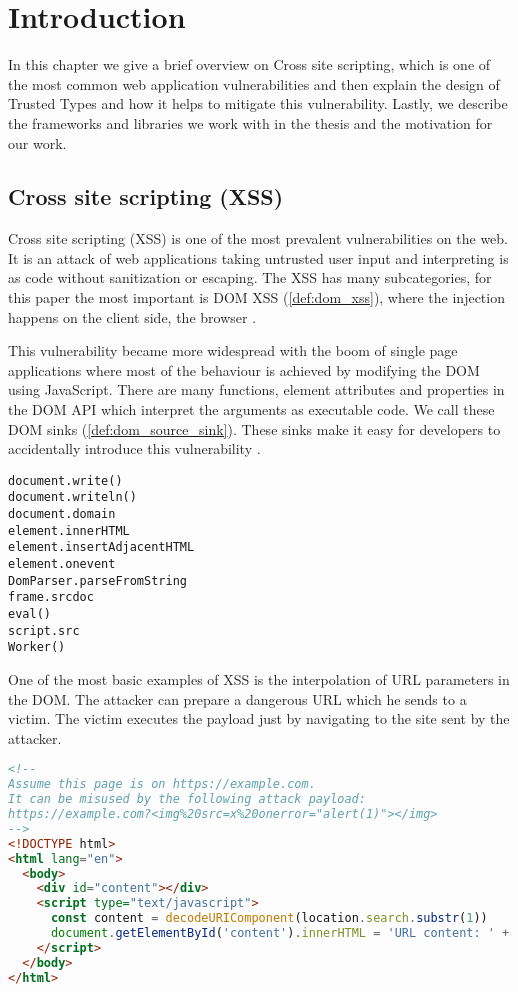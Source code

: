\chapter{Introduction}
\label{chapter_intro}

In this chapter we give a brief overview on Cross site scripting, which is one of the most common
web application vulnerabilities and then explain the design of Trusted Types and how it helps to
mitigate this vulnerability. Lastly, we describe the frameworks and libraries we work with in the
thesis and the motivation for our work.

\section{Cross site scripting (XSS)}

Cross site scripting (XSS) is one of the most prevalent vulnerabilities on the web. It is an attack
of web applications taking untrusted user input and interpreting is as code without sanitization or
escaping. The XSS has many subcategories, for this paper the most important is DOM XSS
(\ref{def:dom_xss}), where the injection happens on the client side, the browser
\cite{tt_web_framework_paper}.

This vulnerability became more widespread with the boom of single page applications where most of
the behaviour is achieved by modifying the DOM using JavaScript. There are many functions, element
attributes and properties in the DOM API which interpret the arguments as executable code. We call
these DOM sinks (\ref{def:dom_source_sink}). These sinks make it easy for developers to accidentally
introduce this vulnerability \cite{tt_web_framework_paper}.

\bigskip
\begin{lstlisting}[language={}, caption=Examples of DOM XSS attack vectors \cite{dom_xss_portswigger} \cite{tt_web_framework_paper}]
document.write()
document.writeln()
document.domain
element.innerHTML
element.insertAdjacentHTML
element.onevent
DomParser.parseFromString
frame.srcdoc
eval()
script.src
Worker()
\end{lstlisting}

One of the most basic examples of XSS is the interpolation of URL parameters in the DOM. The
attacker can prepare a dangerous URL which he sends to a victim. The victim executes the payload
just by navigating to the site sent by the attacker.

\bigskip
\begin{lstlisting}[language=HTML, caption=Basic example of XSS via unsafe URL parameter interpolation]
<!--
Assume this page is on https://example.com.
It can be misused by the following attack payload:
https://example.com?<img%20src=x%20onerror="alert(1)"></img>
-->
<!DOCTYPE html>
<html lang="en">
  <body>
    <div id="content"></div>
    <script type="text/javascript">
      const content = decodeURIComponent(location.search.substr(1))
      document.getElementById('content').innerHTML = 'URL content: ' + content
    </script>
  </body>
</html>
\end{lstlisting}

